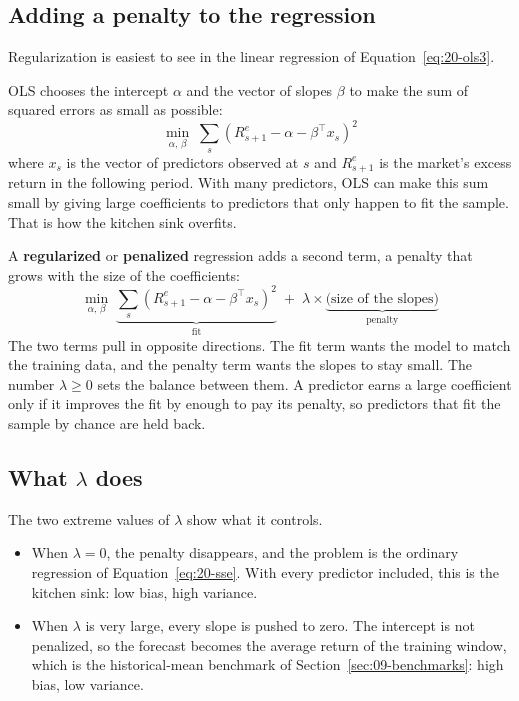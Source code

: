\subsection{Adding a penalty to the regression}

Regularization is easiest to see in the linear regression of Equation~\eqref{eq:20-ols3}.

OLS chooses the intercept $\alpha$ and the vector of slopes $\beta$ to make the sum of squared errors as small as possible:
\begin{equation}
  \min_{\alpha,\,\beta} \; \sum_{s} \left(R^{e}_{s+1} - \alpha - \beta^{\top} x_s\right)^2
  \label{eq:20-sse}
\end{equation}
where $x_s$ is the vector of predictors observed at $s$ and $R^{e}_{s+1}$ is the market's excess return in the following period. With many predictors, OLS can make this sum small by giving large coefficients to predictors that only happen to fit the sample. That is how the kitchen sink overfits.

A \textbf{regularized} or \textbf{penalized} regression adds a second term, a penalty that grows with the size of the coefficients:
\begin{equation}
  \min_{\alpha,\,\beta} \; \underbrace{\sum_{s} \left(R^{e}_{s+1} - \alpha - \beta^{\top} x_s\right)^2}_{\text{fit}}
  \; + \; \lambda \times \underbrace{\text{(size of the slopes)}}_{\text{penalty}}
  \label{eq:20-penalty}
\end{equation}
The two terms pull in opposite directions. The fit term wants the model to match the training data, and the penalty term wants the slopes to stay small. The number $\lambda \ge 0$ sets the balance between them. A predictor earns a large coefficient only if it improves the fit by enough to pay its penalty, so predictors that fit the sample by chance are held back.

\subsection{What \texorpdfstring{$\lambda$}{lambda} does}

The two extreme values of $\lambda$ show what it controls.

\begin{itemize}
  \item When $\lambda = 0$, the penalty disappears, and the problem is the ordinary regression of Equation~\eqref{eq:20-sse}. With every predictor included, this is the kitchen sink: low bias, high variance.
  \item When $\lambda$ is very large, every slope is pushed to zero. The intercept is not penalized, so the forecast becomes the average return of the training window, which is the historical-mean benchmark of Section~\ref{sec:09-benchmarks}: high bias, low variance.
\end{itemize}

